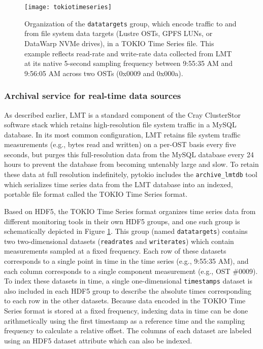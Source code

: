 \begin{figure}
    \centering
    \texttt{[image: tokiotimeseries]}
    \caption{Organization of the \texttt{datatargets} group, which encode traffic to and from file system data targets (Lustre OSTs, GPFS LUNs, or DataWarp NVMe drives), in a TOKIO Time Series file.
    This example reflects read-rate and write-rate data collected from LMT at its native 5-second sampling frequency between 9:55:35 AM and 9:56:05 AM across two OSTs (0x0009 and 0x000a).
    }
    \label{fig:tokiotimeseries}
    \vspace{-.2in}
\end{figure}

\subsubsection{Archival service for real-time data sources}

As described earlier, LMT is a standard component of the Cray ClusterStor software stack which retains high-resolution file system traffic in a MySQL database.
In its most common configuration, LMT retains file system traffic measurements (e.g., bytes read and written) on a per-OST basis every five seconds, but purges this full-resolution data from the MySQL database every 24 hours to prevent the database from becoming untenably large and slow.
To retain these data at full resolution indefinitely, pytokio includes the \texttt{archive\_lmtdb} tool which serializes time series data from the LMT database into an indexed, portable file format called the TOKIO Time Series format.

Based on HDF5, the TOKIO Time Series format organizes time series data from different monitoring tools in their own HDF5 groups, and one such group is schematically depicted in Figure \ref{fig:tokiotimeseries}.
This group (named \texttt{datatargets}) contains two two-dimensional datasets (\texttt{readrates} and \texttt{writerates}) which contain measurements sampled at a fixed frequency.
Each row of these datasets corresponds to a single point in time in the time series (e.g., 9:55:35 AM), and each column corresponds to a single component measurement (e.g., OST \#0009).
To index these datasets in time, a single one-dimensional \texttt{timestamps} dataset is also included in each HDF5 group to describe the absolute times corresponding to each row in the other datasets.
Because data encoded in the TOKIO Time Series format is stored at a fixed frequency, indexing data in time can be done arithmetically using the first timestamp as a reference time and the sampling frequency to calculate a relative offset.
The columns of each dataset are labeled using an HDF5 dataset attribute which can also be indexed.

